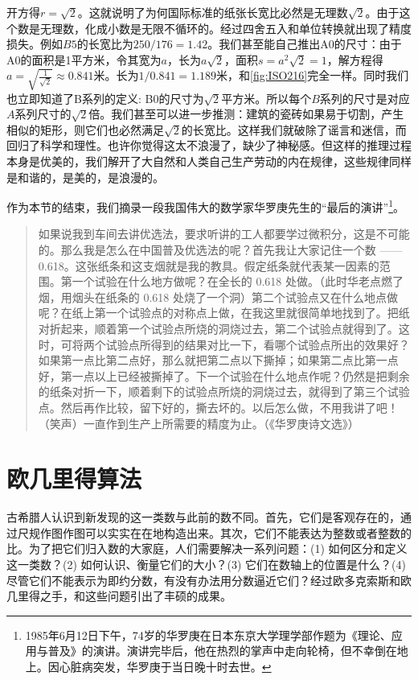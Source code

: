 \documentclass[b5paper]{ctexart}
\begin{document}
开方得$r = \sqrt{2}$。这就说明了为何国际标准的纸张长宽比必然是无理数$\sqrt{2}$。由于这个数是无理数，化成小数是无限不循环的。经过四舍五入和单位转换就出现了精度损失。例如$B5$的长宽比为$250/176 = 1.42$。我们甚至能自己推出A0的尺寸：由于A0的面积是1平方米，令其宽为$a$，长为$a\sqrt{2}$，面积$s = a^2\sqrt{2} = 1$，解方程得$a = \sqrt{\frac{1}{\sqrt{2}}} \approx 0.841$米。长为$1 / 0.841 = 1.189$米，和\cref{fig:ISO216}完全一样。同时我们也立即知道了B系列的定义: B0的尺寸为$\sqrt{2}$平方米。所以每个$B$系列的尺寸是对应$A$系列尺寸的$\sqrt{2}$倍。我们甚至可以进一步推测：建筑的瓷砖如果易于切割，产生相似的矩形，则它们也必然满足$\sqrt{2}$的长宽比。这样我们就破除了谣言和迷信，而回归了科学和理性。也许你觉得这太不浪漫了，缺少了神秘感。但这样的推理过程本身是优美的，我们解开了大自然和人类自己生产劳动的内在规律，这些规律同样是和谐的，是美的，是浪漫的。

作为本节的结束，我们摘录一段我国伟大的数学家华罗庚先生的“最后的演讲”\footnote{1985年6月12日下午，74岁的华罗庚在日本东京大学理学部作题为《理论、应用与普及》的演讲。演讲完毕后，他在热烈的掌声中走向轮椅，但不幸倒在地上。因心脏病突发，华罗庚于当日晚十时去世。}。

\begin{quotation}
如果说我到车间去讲优选法，要求听讲的工人都要学过微积分，这是不可能的。那么我是怎么在中国普及优选法的呢？首先我让大家记住一个数 ——0.618。这张纸条和这支烟就是我的教具。假定纸条就代表某一因素的范围。第一个试验在什么地方做呢？在全长的 0.618 处做。（此时华老点燃了烟，用烟头在纸条的 0.618 处烧了一个洞）第二个试验点又在什么地点做呢？在纸上第一个试验点的对称点上做，在我这里就很简单地找到了。把纸对折起来，顺着第一个试验点所烧的洞烧过去，第二个试验点就得到了。这时，可将两个试验点所得到的结果对比一下，看哪个试验点所出的效果好？如果第一点比第二点好，那么就把第二点以下撕掉；如果第二点比第一点好，第一点以上已经被撕掉了。下一个试验在什么地点作呢？仍然是把剩余的纸条对折一下，顺着剩下的试验点所烧的洞烧过去，就得到了第三个试验点。然后再作比较，留下好的，撕去坏的。以后怎么做，不用我讲了吧！（笑声）一直作到生产上所需要的精度为止。（《华罗庚诗文选》）
\end{quotation}

\section{欧几里得算法}

古希腊人认识到新发现的这一类数与此前的数不同。首先，它们是客观存在的，通过尺规作图作图可以实实在在地构造出来。其次，它们不能表达为整数或者整数的比。为了把它们归入数的大家庭，人们需要解决一系列问题：(1) 如何区分和定义这一类数？(2) 如何认识、衡量它们的大小？(3) 它们在数轴上的位置是什么？(4) 尽管它们不能表示为即约分数，有没有办法用分数逼近它们？经过欧多克索斯和欧几里得之手，和这些问题引出了丰硕的成果。
\end{document}
